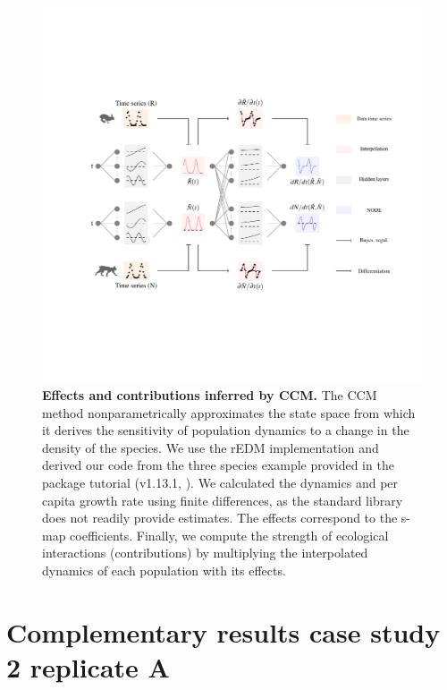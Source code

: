 \documentclass[11pt, oneside]{article}
\begin{document}
\begin{figure}[H]
\includegraphics[width=1\linewidth,page=13]{figures/main.pdf}
\caption{
    \textbf{Effects and contributions inferred by CCM.}
    The CCM method nonparametrically approximates the state space from which it derives the sensitivity of population dynamics to a change in the density of the species.
    We use the rEDM implementation and derived our code from the three species example provided in the package tutorial (v1.13.1, \cite{Sugihara2012}).
    We calculated the dynamics and per capita growth rate using finite differences, as the standard library does not readily provide estimates.
    The effects correspond to the s-map coefficients.
    Finally, we compute the strength of ecological interactions (contributions) by multiplying the interpolated dynamics of each population with its effects.
}
\end{figure}
\newpage


\newpage
\section{Complementary results case study 2 replicate A}
\end{document}
